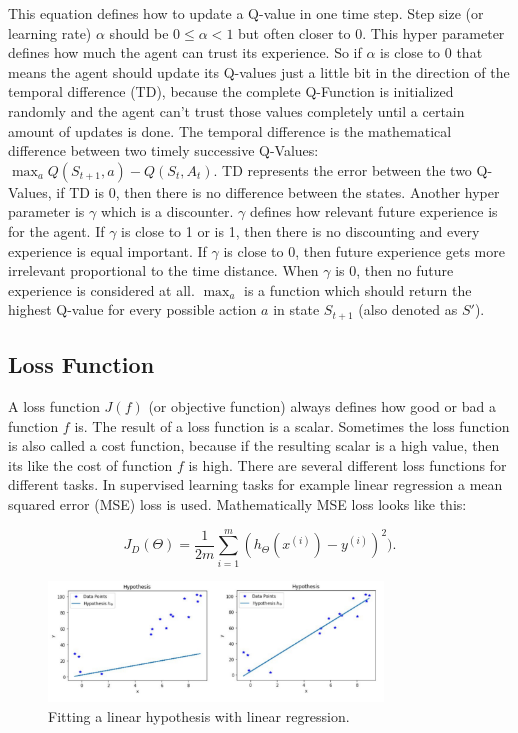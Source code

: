 \documentclass[conference]{IEEEtran}
\begin{document}
This equation defines how to update a Q-value in one time step. Step size (or learning rate) $\alpha$ should be $0 \le \alpha < 1$ but often closer to $0$. This hyper parameter defines how much the agent can trust its experience. So if $\alpha$ is close to $0$ that means the agent should update its Q-values just a little bit in the direction of the temporal difference (TD), because the complete Q-Function is initialized randomly and the agent can't trust those values completely until a certain amount of updates is done. The temporal difference is the mathematical difference between two timely successive Q-Values: $\max_a Q(S_{t+1},a) - Q(S_t, A_t)$. TD represents the error between the two Q-Values, if TD is 0, then there is no difference between the states. Another hyper parameter is $\gamma$ which is a discounter. $\gamma$ defines how relevant future experience is for the agent. If $\gamma$ is close to 1 or is 1, then there is no discounting and every experience is equal important. If $\gamma$ is close to 0, then future experience gets more irrelevant proportional to the time distance. When $\gamma$ is 0, then no future experience is considered at all. $\max_a$ is a function which should return the highest Q-value for every possible action $a$ in state $S_{t+1}$ (also denoted as $S'$). 

\subsection{Loss Function}
A loss function $J(f)$ (or objective function) always defines how good or bad a function $f$ is. The result of a loss function is a scalar. Sometimes the loss function is also called a cost function, because if the resulting scalar is a high value, then its like the cost of function $f$ is high. There are several different loss functions for different tasks. In supervised learning tasks for example linear regression a mean squared error (MSE) loss is used. Mathematically MSE loss looks like this: 

\begin{equation*}
J_D(\Theta) = \frac{1}{2m} \sum^m_{i=1}(h_\Theta(x^{(i)}) - y^{(i)})^2).
\end{equation*}

\begin{figure}[!t]
\centering
\includegraphics[width=3.5in]{linear_regression_model_fit}
\caption{Fitting a linear hypothesis with linear regression.}
\label{fig:linear_regression_model_fit}
\end{figure}
\end{document}
